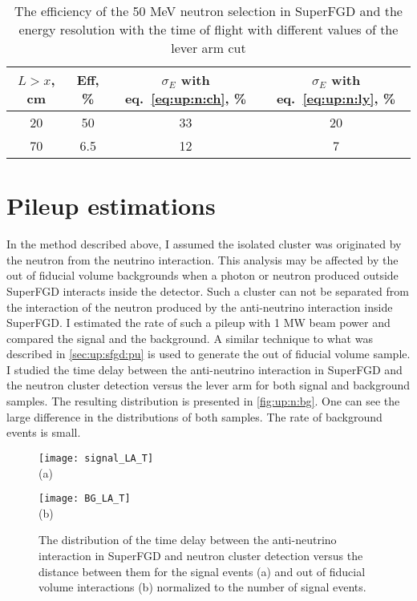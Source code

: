 \documentclass[main.tex]{subfiles}
\begin{document}
\begin{table}[!ht]
  \centering
  \begin{tabular}{|c|c|c|c|}
    \hline
    $L > x$, cm & Eff, \% & $\sigma_E$ with eq.~\ref{eq:up:n:ch}, \% & $\sigma_E$ with eq.~\ref{eq:up:n:ly}, \% \\
    \hline
    20 & 50  & 33  & 20 \\
    \hline
    70 & 6.5  & 12 & 7 \\
    \hline
  \end{tabular}
  \caption{The efficiency of the 50 MeV neutron selection in SuperFGD and the energy resolution with the time of flight with different values of the lever arm cut}
  \label{tbl:up:n:sum}
\end{table}

\section{Pileup estimations}
In the method described above, I assumed the isolated cluster was originated by the neutron from the neutrino interaction. This analysis may be affected by the out of fiducial volume backgrounds when a photon or neutron produced outside SuperFGD interacts inside the detector. Such a cluster can not be separated from the interaction of the neutron produced by the anti-neutrino interaction inside SuperFGD. I estimated the rate of such a pileup with 1 MW beam power and compared the signal and the background. A similar technique to what was described in \autoref{sec:up:sfgd:pu} is used to generate the out of fiducial volume sample. I studied the time delay between the anti-neutrino interaction in SuperFGD and the neutron cluster detection versus the lever arm for both signal and background samples. The resulting distribution is presented in \autoref{fig:up:n:bg}. One can see the large difference in the distributions of both samples. The rate of background events is small.

\begin{figure}[!ht]
  \centering
  \begin{minipage}{0.49\linewidth}
    \centering
    \texttt{[image: signal\_LA\_T]} \\ (a)
  \end{minipage}
  \begin{minipage}{0.49\linewidth}
    \centering
    \texttt{[image: BG\_LA\_T]} \\ (b)
  \end{minipage}
  \caption{The distribution of the time delay between the anti-neutrino interaction in SuperFGD and neutron cluster detection versus the distance between them for the signal events (a) and out of fiducial volume interactions (b) normalized to the number of signal events.}
  \label{fig:up:n:bg}
\end{figure}
\end{document}
